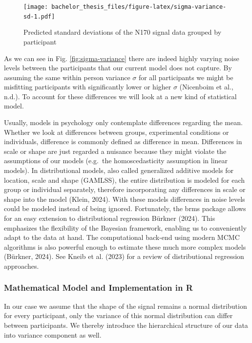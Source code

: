 \documentclass[
  doc,12pt,floatsintext]{apa7}
\begin{document}
\begin{figure}
\centering
\texttt{[image: bachelor\_thesis\_files/figure-latex/sigma-variance-sd-1.pdf]}
\caption{\label{fig:sigma-variance-sd}Predicted standard deviations of the N170 signal data grouped by participant}
\end{figure}

As we can see in Fig. \ref{fig:sigma-variance} there are indeed highly varying noise levels between the participants that our current model does not capture. By assuming the same within person variance \(\sigma\) for all participants we might be misfitting participants with significantly lower or higher \(\sigma\) (Nicenboim et al., n.d.). To account for these differences we will look at a new kind of statistical model.

Usually, models in psychology only contemplate differences regarding the mean. Whether we look at differences between groups, experimental conditions or individuals, difference is commonly defined as difference in mean. Differences in scale or shape are just regarded a nuisance because they might violate the assumptions of our models (e.g.~the homoscedasticity assumption in linear models). In distributional models, also called generalized additive models for location, scale and shape (GAMLSS), the entire distribution is modeled for each group or individual separately, therefore incorporating any differences in scale or shape into the model (Klein, 2024). With these models differences in noise levels could be modeled instead of being ignored. Fortunately, the brms package allows for an easy extension to distributional regression Bürkner (2024). This emphasizes the flexibility of the Bayesian framework, enabling us to conveniently adapt to the data at hand. The computational back-end using modern MCMC algorithms is also powerful enough to estimate these much more complex models (Bürkner, 2024). See Kneib et al. (2023) for a review of distributional regression approaches.

\subsubsection{Mathematical Model and Implementation in R}\label{mathematical-model-and-implementation-in-r-1}

In our case we assume that the shape of the signal remains a normal distribution for every participant, only the variance of this normal distribution can differ between participants. We thereby introduce the hierarchical structure of our data into variance component as well.
\end{document}
